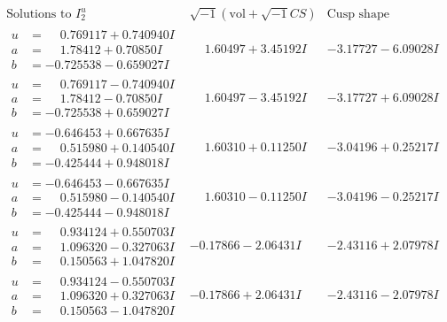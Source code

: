\documentclass[1p]{elsarticle_modified}
\theoremstyle{definition}
\newcommand{\I}{\sqrt{-1}}
\begin{document}
$$\begin{array}{c|c|c}  
\text{Solutions to }I^u_{2}& \I (\text{vol} + \sqrt{-1}CS) & \text{Cusp shape}\\
 \hline 
\begin{aligned}
u &= \phantom{-}0.769117 + 0.740940 I \\
a &= \phantom{-}1.78412 + 0.70850 I \\
b &= -0.725538 - 0.659027 I\end{aligned}
 & \phantom{-}1.60497 + 3.45192 I & -3.17727 - 6.09028 I \\ \hline\begin{aligned}
u &= \phantom{-}0.769117 - 0.740940 I \\
a &= \phantom{-}1.78412 - 0.70850 I \\
b &= -0.725538 + 0.659027 I\end{aligned}
 & \phantom{-}1.60497 - 3.45192 I & -3.17727 + 6.09028 I \\ \hline\begin{aligned}
u &= -0.646453 + 0.667635 I \\
a &= \phantom{-}0.515980 + 0.140540 I \\
b &= -0.425444 + 0.948018 I\end{aligned}
 & \phantom{-}1.60310 + 0.11250 I & -3.04196 + 0.25217 I \\ \hline\begin{aligned}
u &= -0.646453 - 0.667635 I \\
a &= \phantom{-}0.515980 - 0.140540 I \\
b &= -0.425444 - 0.948018 I\end{aligned}
 & \phantom{-}1.60310 - 0.11250 I & -3.04196 - 0.25217 I \\ \hline\begin{aligned}
u &= \phantom{-}0.934124 + 0.550703 I \\
a &= \phantom{-}1.096320 - 0.327063 I \\
b &= \phantom{-}0.150563 + 1.047820 I\end{aligned}
 & -0.17866 - 2.06431 I & -2.43116 + 2.07978 I \\ \hline\begin{aligned}
u &= \phantom{-}0.934124 - 0.550703 I \\
a &= \phantom{-}1.096320 + 0.327063 I \\
b &= \phantom{-}0.150563 - 1.047820 I\end{aligned}
 & -0.17866 + 2.06431 I & -2.43116 - 2.07978 I \\ \hline\begin{aligned}

\end{aligned}
\end{array}$$
\end{document}
